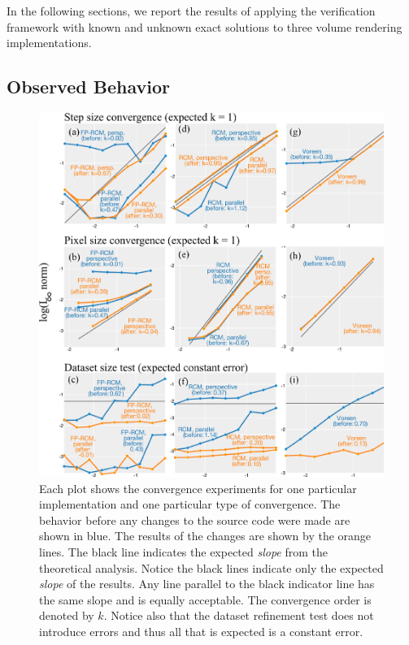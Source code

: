 In the following sections, we report the results of applying the
verification framework with known and unknown exact solutions to three
volume rendering implementations. 


\subsection{Observed Behavior}

\begin{figure}[b]
\centering
\includegraphics[width=1\linewidth]{chapter5/figures/convergence_table.png}
\caption{\label{fig:convergence} Each plot shows the convergence
  experiments for one particular implementation and one particular
  type of convergence. The behavior before any changes to the source
  code were made are shown in blue. The results of the changes are shown by the
  orange lines. The black line indicates the expected \emph{slope} from the
  theoretical analysis. Notice the black lines indicate only the
  expected \emph{slope} of the results. Any line parallel to the black
  indicator line has the same slope and is equally acceptable.  The
  convergence order is denoted by $k$. Notice also that the dataset refinement test does not introduce errors and thus all that is expected is a constant error.
}
\end{figure}



